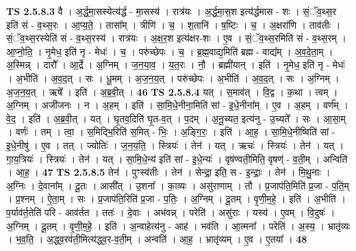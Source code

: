\documentclass[17pt]{extarticle}
\begin{document}
                  \newline
                                \textbf{ TS 2.5.8.3} \newline
                  वै । अ॒र्द्ध॒मा॒सस्येत्य॑र्द्ध - मा॒सस्य॑ । रात्र॑यः । अ॒र्द्ध॒मा॒स॒श इत्य॑र्द्धमास - शः । सं॒ॅव॒थ्स॒र इति॑ सं - व॒थ्स॒रः । आ॒प्य॒ते॒ । तासा᳚म् । त्रीणि॑ । च॒ । श॒तानि॑ । ष॒ष्टिः । च॒ । अ॒क्षरा॑णि । ताव॑तीः । सं॒ॅव॒थ्स॒रस्येति॑ सं - व॒थ्स॒रस्य॑ । रात्र॑यः । अ॒क्ष॒र॒श इत्य॑क्षर-शः । ए॒व । सं॒ॅव॒थ्स॒रमिति॑ सं - व॒थ्स॒रम् । आ॒प्नो॒ति॒ । नृ॒मेध॒ इति॑ नृ - मेधः॑ । च॒ । परु॑च्छेपः । च॒ । ब्र॒ह्म॒वाद्य॒मिति॑ ब्रह्म - वाद्य᳚म् । अ॒व॒दे॒ता॒म् । अ॒स्मिन्न् । दारौ᳚ । आ॒र्द्रे । अ॒ग्निम् । ज॒न॒या॒व॒ । य॒त॒रः । नौ॒ । ब्रह्मी॑यान् । इति॑ । नृ॒मेध॒ इति॑ नृ - मेधः॑ । अ॒भीति॑ । अ॒व॒द॒त् । सः । धू॒मम् । अ॒ज॒न॒य॒त् । परु॑च्छेपः । अ॒भीति॑ । अ॒व॒द॒त् । सः । अ॒ग्निम् । अ॒ज॒न॒य॒त् । ऋषे᳚ । इति॑ । अ॒ब्र॒वी॒त् । \textbf{  46} \newline
                  \newline
                                \textbf{ TS 2.5.8.4} \newline
                  यत् । स॒माव॑त् । वि॒द्व । क॒था । त्वम् । अ॒ग्निम् । अजी॑जनः । न । अ॒हम् । इति॑ । सा॒मि॒धे॒नीना॒मिति॑ सां - इ॒धे॒नीना᳚म् । ए॒व । अ॒हम् । वर्ण᳚म् । वे॒द॒ । इति॑ । अ॒ब्र॒वी॒त् । यत् । घृ॒तव॒दिति॑ घृ॒त-व॒त् । प॒दम् । अ॒नू॒च्यत॒ इत्य॑नु - उ॒च्यते᳚ । सः । आ॒सा॒म् । वर्णः॑ । तम् । त्वा॒ । स॒मिद्भि॒रिति॑ स॒मित् - भिः॒ । अ॒ङ्गि॒रः॒ । इति॑ । आ॒ह॒ । सा॒मि॒धे॒नीष्विति॑ सां - इ॒धे॒नीषु॑ । ए॒व । तत् । ज्योतिः॑ । ज॒न॒य॒ति॒ । स्त्रियः॑ । तेन॑ । यत् । ऋचः॑ । स्त्रियः॑ । तेन॑ । यत् । गा॒य॒त्रियः॑ । स्त्रियः॑ । तेन॑ । यत् । सा॒मि॒धे॒न्य॑ इति॑ सां - इ॒धे॒न्यः॑ । वृष॑ण्वती॒मिति॒ वृषण्॑ - व॒ती॒म् । अन्विति॑ । आ॒ह॒ । \textbf{  47} \newline
                  \newline
                                \textbf{ TS 2.5.8.5} \newline
                  तेन॑ । पुꣳस्व॑तीः । तेन॑ । सेन्द्रा॒ इति॒ स - इ॒न्द्राः॒ । तेन॑ । मि॒थु॒नाः । अ॒ग्निः । दे॒वाना᳚म् । दू॒तः । आसी᳚त् । उ॒शना᳚ । का॒व्यः । असु॑राणाम् । तौ । प्र॒जाप॑ति॒मिति॑ प्र॒जा - प॒ति॒म् । प्र॒श्नम् । ऐ॒ता॒म् । सः । प्र॒जाप॑ति॒रिति॑ प्र॒जा - प॒तिः॒ । अ॒ग्निम् । दू॒तम् । वृ॒णी॒म॒हे॒ । इति॑ । अ॒भीति॑ । प॒र्याव॑र्त॒तेति॑ परि - आव॑र्तत । ततः॑ । दे॒वाः । अभ॑वन्न् । परेति॑ । असु॑राः । यस्य॑ । ए॒वम् । वि॒दुषः॑ । अ॒ग्निम् । दू॒तम् । वृ॒णी॒म॒हे॒ । इति॑ । अ॒न्वाहेत्य॑नु - आह॑ । भव॑ति । आ॒त्मना᳚ । परेति॑ । अ॒स्य॒ । भ्रातृ॑व्यः । भ॒व॒ति॒ । अ॒द्ध्व॒रव॑ती॒मित्य॑द्ध्व॒र-व॒ती॒म् । अन्वति॑ । आ॒ह॒ । भ्रातृ॑व्यम् । ए॒व । ए॒तया᳚ । \textbf{  48} \newline
\end{document}
